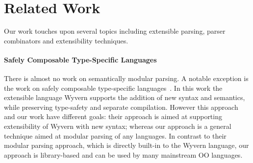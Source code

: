 \vspace{-3pt}
\section{Related Work}\label{sec:relatedwork}

%
%
%
%

Our work touches upon several topics including extensible parsing,
parser combinators and extensibility techniques. 

\begin{comment}
There has been a
great amount of related papers on those topics. Some
inspired us of this paper and encourage us for more exploration. This
section will try to lead a discussion on what difference we have made.
\end{comment}

\paragraph{Safely Composable Type-Specific Languages} 

There is almost no work on 
semantically modular parsing. A notable exception is the work 
on safely composable type-specific languages~\cite{omar14}. In this
work the extensible language Wyvern supports the addition of new
syntax and semantics, while preserving type-safety and separate
compilation. However this approach and our work have different goals: 
their approach is aimed at supporting extensibility of Wyvern with
new syntax; whereas our approach is a general technique aimed at 
modular parsing of any languages. In contrast to their modular parsing 
approach, which is directly built-in to the Wyvern language, our approach is 
library-based and can be used by many  mainstream OO languages.



